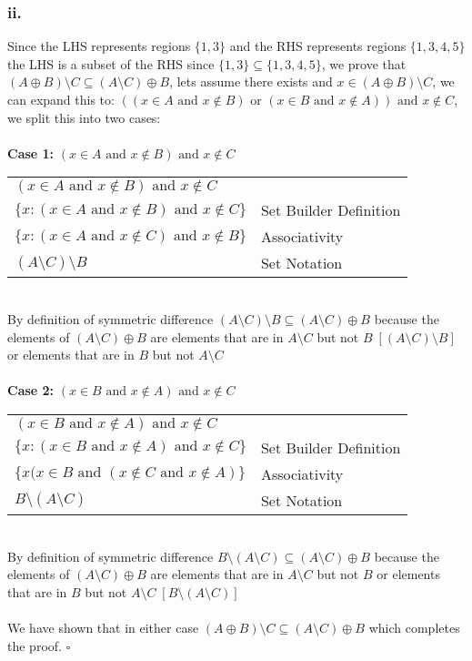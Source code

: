 \documentclass{article}
\begin{document}
  \subsubsection*{ii.}
Since the LHS represents regions $\{1,3\}$ and the RHS represents regions $\{1,3,4,5\}$ the LHS is a subset of the RHS since $\{1,3\}\subseteq\{1,3,4,5\}$, we prove that $(A\oplus B)\setminus C\subseteq(A\setminus C)\oplus B$, lets assume there exists and $x\in (A\oplus B)\setminus C$, we can expand this to: $((x\in A \text{ and } x\not\in B)\text{ or } (x\in B \text{ and } x\not\in A)) \text{ and } x\not\in C$, we split this into two cases: \\\\
\textbf{Case 1:} $(x\in A \text{ and } x\not\in B) \text{ and } x\not\in C$
\begin{table}[ht]
    \begin{tabular}{ll}
        $(x\in A \text{ and } x\not\in B)\text{ and } x\not\in C$ & \\
        $\{x:(x\in A \text{ and } x\not\in B)\text{ and } x\not\in C\}$ & Set Builder Definition\\
        $\{x:(x\in A \text{ and } x\not\in C)\text{ and } x\not\in B\}$ & Associativity\\
        $(A\setminus C)\setminus B$ & Set Notation
    \end{tabular}
\end{table} \\
By definition of symmetric difference $(A\setminus C)\setminus B\subseteq(A\setminus C)\oplus B$ because the elements of $(A\setminus C)\oplus B$ are elements that are in $A\setminus C$ but not $B\; \left[(A\setminus C)\setminus B\right]$ or elements that are in $B$ but not $A\setminus C$ \\\\
\textbf{Case 2:} $(x\in B \text{ and } x\not\in A) \text{ and } x\not\in C$
\begin{table}[ht]
    \begin{tabular}{ll}
        $(x\in B \text{ and } x\not\in A)\text{ and } x\not\in C$ & \\
        $\{x:(x\in B \text{ and } x\not\in A)\text{ and } x\not\in C\}$ & Set Builder Definition\\
        $\{x(x\in B \text{ and } (x\not\in C\text{ and } x\not\in A)\}$ & Associativity\\
        $B\setminus (A\setminus C)$ & Set Notation
    \end{tabular}
\end{table} \\
By definition of symmetric difference $B\setminus (A\setminus C)\subseteq(A\setminus C)\oplus B$ because the elements of $(A\setminus C)\oplus B$ are elements that are in $A\setminus C$ but not $B$ or elements that are in $B$ but not $A\setminus C\; \left[B\setminus (A\setminus C)\right]$ \\\\
We have shown that in either case $(A\oplus B)\setminus C\subseteq(A\setminus C)\oplus B$ which completes the proof. $\square$
\newpage
\end{document}
